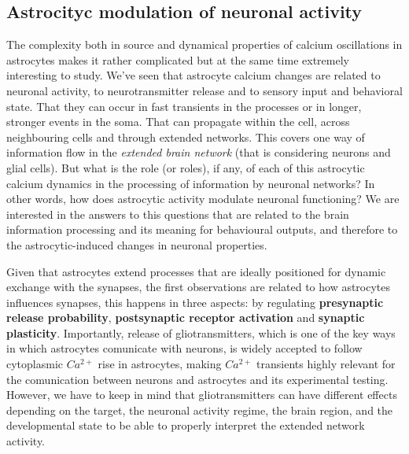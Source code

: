 \subsection{Astrocityc modulation of neuronal activity}
\label{chap1:sec:2:subsec2:astro_neuromodulation}
The complexity both in source and dynamical properties of calcium oscillations in astrocytes makes it rather complicated but at the same time extremely interesting to study.
We've seen that astrocyte calcium changes are related to neuronal activity, to neurotransmitter release and to sensory input and behavioral state.
That they can occur in fast transients in the processes or in longer, stronger events in the soma. 
That can propagate within the cell, across neighbouring cells and through extended networks.
This covers one way of information flow in the \textit{extended brain network} (that is considering neurons and glial cells). 
But what is the role (or roles), if any, of each of this astrocytic calcium dynamics in the processing of information by neuronal networks?
In other words, how does astrocytic activity modulate neuronal functioning?
We are interested in the answers to this questions that are related to the brain information processing and its meaning for behavioural outputs, and therefore to the astrocytic-induced changes in neuronal properties. 

Given that astrocytes extend processes that are ideally positioned for dynamic exchange with the synapses, the first observations are related to how astrocytes influences synapses, this happens in three aspects: by regulating \textbf{presynaptic release probability}, \textbf{postsynaptic receptor activation} and \textbf{synaptic plasticity}.
Importantly, release of gliotransmitters, which is one of the key ways in which astrocytes comunicate with neurons, is widely accepted to follow cytoplasmic $Ca^{2+}$ rise in astrocytes, making $Ca^{2+}$ transients highly relevant for the comunication between neurons and astrocytes and its experimental testing.
However, we have to keep in mind that gliotransmitters can have different effects depending on the target, the neuronal activity regime, the brain region, and the developmental state to be able to properly interpret the extended network activity. 

